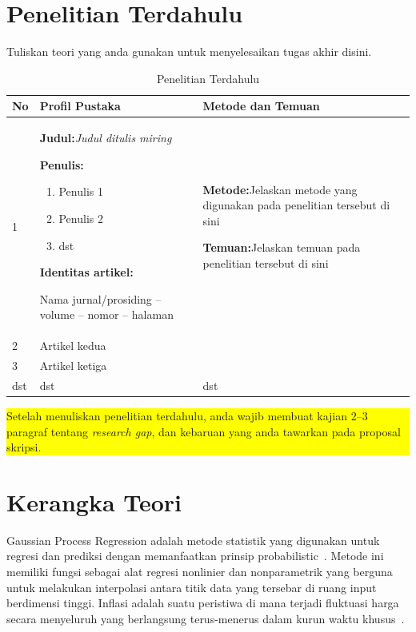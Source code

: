 \documentclass[a4paper,12pt]{report}
\begin{document}
\section{Penelitian Terdahulu}
Tuliskan teori yang anda gunakan untuk menyelesaikan tugas akhir disini.

\begin{table}[h]
  \caption{Penelitian Terdahulu}
  \label{tab:terdahulu}
  \centering\singlespacing\small
  \begin{tabular}{|p{0.9cm}|p{6.3cm}|p{6.3cm}|}
    \hline
    \rowcolor{gray!15}\textbf{No} & \textbf{Profil Pustaka} & \textbf{Metode dan Temuan}\\
    \hline
    1 &
    \textbf{Judul:}\newline \textit{Judul ditulis miring}\par\smallskip 
    \textbf{Penulis:}
    \begin{enumerate}[nosep,leftmargin=*,label=\arabic*.]
      \item Penulis 1
      \item Penulis 2
      \item dst
    \end{enumerate}
    \par\smallskip\textbf{Identitas artikel:}\par
    Nama jurnal/prosiding -- volume -- nomor -- halaman
    &
    \textbf{Metode:}\newline Jelaskan metode yang digunakan pada penelitian tersebut di sini\par\smallskip 
    \textbf{Temuan:}\newline Jelaskan temuan pada penelitian tersebut di sini\\
    \hline
    2 & Artikel kedua & \\
    \hline
    3 & Artikel ketiga & \\
    \hline
    dst & dst & dst\\
    \hline
  \end{tabular}
\end{table}

\colorbox{yellow}{\parbox{\dimexpr\linewidth-2\fboxsep}{\singlespacing
Setelah menuliskan penelitian terdahulu, anda wajib membuat kajian 2--3 paragraf tentang
\textit{research gap}, dan kebaruan yang anda tawarkan pada proposal skripsi.}}

\section{Kerangka Teori}
Gaussian Process Regression adalah metode statistik yang digunakan untuk regresi dan prediksi
dengan memanfaatkan prinsip probabilistic~\cite{ref18}. Metode ini memiliki fungsi sebagai alat regresi
nonlinier dan nonparametrik yang berguna untuk melakukan interpolasi antara titik data yang
tersebar di ruang input berdimensi tinggi. Inflasi adalah suatu peristiwa di mana terjadi
fluktuasi harga secara menyeluruh yang berlangsung terus-menerus dalam kurun waktu khusus~\cite{ref23}.
\end{document}
